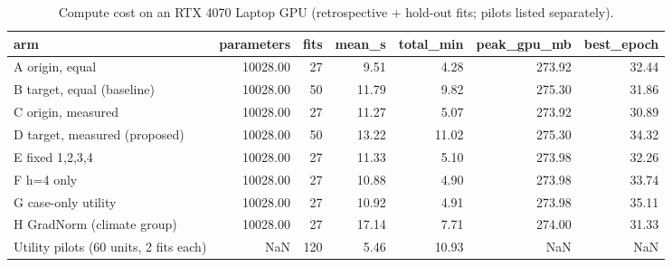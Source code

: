 \begin{table}[t]
\centering
\small
\caption{Compute cost on an RTX 4070 Laptop GPU (retrospective + hold-out fits; pilots listed separately).}
\label{tab:compute}
\begin{tabular}{lrrrrrr}
\toprule
arm & parameters & fits & mean\_s & total\_min & peak\_gpu\_mb & best\_epoch \\
\midrule
A origin, equal & 10028.00 & 27 & 9.51 & 4.28 & 273.92 & 32.44 \\
B target, equal (baseline) & 10028.00 & 50 & 11.79 & 9.82 & 275.30 & 31.86 \\
C origin, measured & 10028.00 & 27 & 11.27 & 5.07 & 273.92 & 30.89 \\
D target, measured (proposed) & 10028.00 & 50 & 13.22 & 11.02 & 275.30 & 34.32 \\
E fixed 1,2,3,4 & 10028.00 & 27 & 11.33 & 5.10 & 273.98 & 32.26 \\
F h=4 only & 10028.00 & 27 & 10.88 & 4.90 & 273.98 & 33.74 \\
G case-only utility & 10028.00 & 27 & 10.92 & 4.91 & 273.98 & 35.11 \\
H GradNorm (climate group) & 10028.00 & 27 & 17.14 & 7.71 & 274.00 & 31.33 \\
Utility pilots (60 units, 2 fits each) & NaN & 120 & 5.46 & 10.93 & NaN & NaN \\
\bottomrule
\end{tabular}
\end{table}
